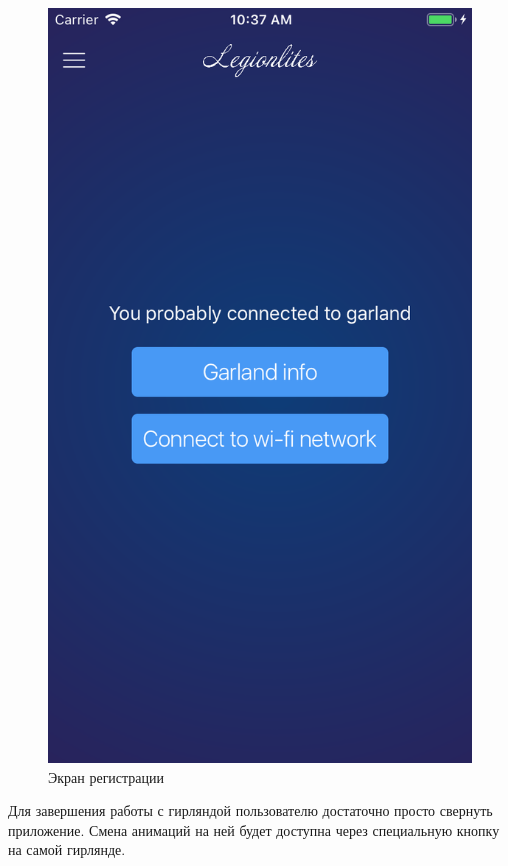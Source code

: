 \begin{figure}[H]
\centering
	\includegraphics[scale=0.2]{figures/userGuide/device.png}
	\caption{Экран регистрации}
	\label{fig:develop:userGuide:device}
\end{figure}

Для завершения работы с гирляндой пользователю достаточно просто свернуть приложение. Смена анимаций на ней будет доступна через специальную кнопку на самой гирлянде.

